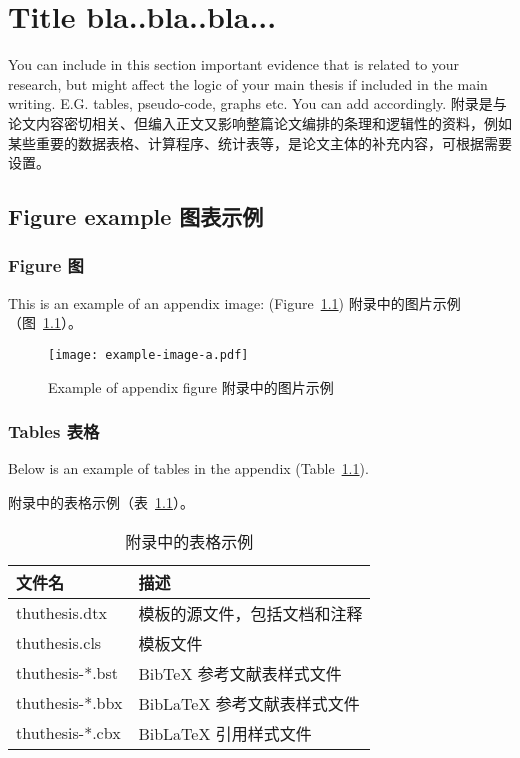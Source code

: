 
\chapter{Title bla..bla..bla...}

You can include in this section important evidence that is related to your research, but might affect the logic of your main thesis if included in the main writing. E.G. tables, pseudo-code, graphs etc. You can add accordingly.
附录是与论文内容密切相关、但编入正文又影响整篇论文编排的条理和逻辑性的资料，例如某些重要的数据表格、计算程序、统计表等，是论文主体的补充内容，可根据需要设置。

\section{Figure example 图表示例}

\subsection{Figure 图}

This is an example of an appendix image: (Figure~\ref{fig:appendix-figure})
附录中的图片示例（图~\ref{fig:appendix-figure}）。

\begin{figure}
  \centering
  \texttt{[image: example-image-a.pdf]}
  \caption{Example of appendix figure 附录中的图片示例}
  \label{fig:appendix-figure}
\end{figure}

\subsection{Tables 表格}

Below is an example of tables in the appendix (Table~\ref{tab:appendix-table}).

附录中的表格示例（表~\ref{tab:appendix-table}）。

\begin{table}
  \centering
  \caption{附录中的表格示例}
  \begin{tabular}{ll}
    \toprule
    文件名          & 描述                         \\
    \midrule
    thuthesis.dtx   & 模板的源文件，包括文档和注释 \\
    thuthesis.cls   & 模板文件                     \\
    thuthesis-*.bst & BibTeX 参考文献表样式文件    \\
    thuthesis-*.bbx & BibLaTeX 参考文献表样式文件  \\
    thuthesis-*.cbx & BibLaTeX 引用样式文件        \\
    \bottomrule
  \end{tabular}
  \label{tab:appendix-table}
\end{table}


